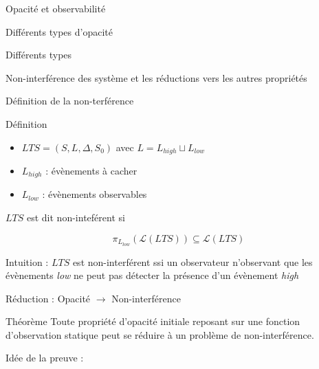 \documentclass[11pt]{beamer}
\begin{document}
\begin{section}{Opacit\'e et observabilit\'e}
\begin{frame}{Diff\'erents types d'opacit\'e}
\begin{block}{Diff\'erents types}
    \end{block}


  \end{frame}

 
\end{section}


\begin{section}{Non-interf\'erence des syst\`eme et les r\'eductions vers les autres propri\'et\'es}


\begin{frame}{D\'efinition de la non-terf\'erence}
\begin{block}{D\'efinition}
\begin{itemize}
  \item $LTS = (S,L,\Delta,S_0)$ avec $L=L_{high}\sqcup L_{low}$
  \item $L_{high}$ : \'ev\`enements \`a cacher
  \item $L_{low}$ : \'ev\`enements observables
\end{itemize}

$LTS$ est dit non-intef\'erent si

$$\pi_{L_{low}}(\mathcal L(LTS)) \subseteq \mathcal L(LTS)$$

Intuition : $LTS$ est non-interf\'erent ssi un observateur n'observant que les \'ev\`enements \emph{low} ne peut pas d\'etecter la pr\'esence d'un \'ev\`enement \emph{high}
\end{block}
\end{frame}
 
\begin{frame}{R\'eduction : Opacit\'e $\to$ Non-interf\'erence}
\begin{beamerlikethm}{Th\'eor\`eme {\cite[page 5]{BryansKMR08}}}
Toute propri\'et\'e d'opacit\'e initiale reposant sur une fonction d'observation statique peut se r\'eduire \`a un probl\`eme  de non-interf\'erence.
\end{beamerlikethm}

Id\'ee de la preuve :

\begin{figure}[H]
  \centering
\end{figure}
\end{frame}
\end{section}
\end{document}
